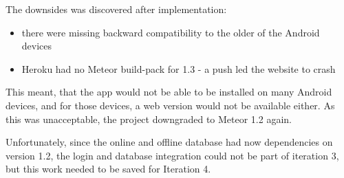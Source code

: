 The downsides was discovered after implementation:
\begin{itemize}
\item there were missing backward compatibility to the older of the Android devices
\item Heroku had no Meteor build-pack for 1.3 - a push led the website to crash
\end{itemize}

This meant, that the app would not be able to be installed on many Android devices, and for those devices, a web version would not be available either. As this was unacceptable, the project downgraded to Meteor 1.2 again.

Unfortunately, since the online and offline database had now dependencies on version 1.2, the login and database integration could not be part of iteration 3, but this work needed to be saved for Iteration 4.
